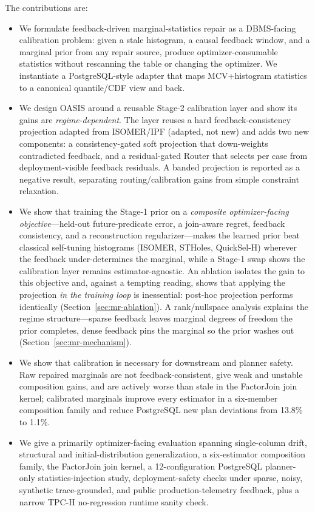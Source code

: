 \documentclass[preprint,12pt]{elsarticle}
\begin{document}
The contributions are:
\begin{itemize}
  \item We formulate feedback-driven marginal-statistics repair as a
        DBMS-facing calibration problem: given a stale histogram, a causal
        feedback window, and a marginal prior from any repair source, produce
        optimizer-consumable statistics without rescanning the table or changing
        the optimizer. We instantiate a PostgreSQL-style adapter that maps
        MCV+histogram statistics to a canonical quantile/CDF view and back.
  \item We design OASIS around a reusable Stage-2 calibration layer and show its
        gains are \emph{regime-dependent}. The layer reuses a hard
        feedback-consistency projection adapted from ISOMER/IPF (adapted, not new)
        and adds two new components: a consistency-gated soft projection that
        down-weights contradicted feedback, and a residual-gated Router
        that selects per case from deployment-visible feedback residuals. A banded
        projection is reported as a negative result, separating
        routing/calibration gains from simple constraint relaxation.
  \item We show that training the Stage-1 prior on a \emph{composite
        optimizer-facing objective}---held-out future-predicate error, a
        join-aware regret, feedback consistency, and a reconstruction
        regularizer---makes the learned prior beat classical self-tuning
        histograms (ISOMER, STHoles, QuickSel-H) wherever the feedback
        under-determines the marginal, while a Stage-1 swap shows the calibration
        layer remains estimator-agnostic. An ablation isolates the gain to this
        objective and, against a tempting reading, shows that applying the
        projection \emph{in the training loop} is inessential: post-hoc projection
        performs identically (Section~\ref{sec:mr-ablation}). A rank/nullspace
        analysis explains the regime structure---sparse feedback leaves marginal
        degrees of freedom the prior completes, dense feedback pins the marginal
        so the prior washes out (Section~\ref{sec:mr-mechanism}).
  \item We show that calibration is necessary for downstream and planner safety.
        Raw repaired marginals are not feedback-consistent, give weak and
        unstable composition gains, and are actively worse than stale in the
        FactorJoin join kernel; calibrated marginals improve every estimator in a
        six-member composition family and reduce PostgreSQL new plan deviations
        from 13.8\% to 1.1\%.
  \item We give a primarily optimizer-facing evaluation spanning single-column
        drift, structural and initial-distribution generalization, a
        six-estimator composition family, the FactorJoin join kernel, a
        12-configuration PostgreSQL planner-only statistics-injection study,
        deployment-safety checks under sparse, noisy, synthetic trace-grounded,
        and public production-telemetry feedback, plus a narrow TPC-H
        no-regression runtime sanity check.
\end{itemize}
\end{document}
